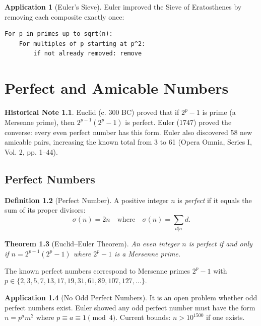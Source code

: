 \documentclass[11pt,a4paper,twoside]{book}
\theoremstyle{eulerstyle}
\newtheorem{theorem}{Theorem}[chapter]
\theoremstyle{definition}
\newtheorem{definition}[theorem]{Definition}
\newtheorem{historical}[theorem]{Historical Note}
\newtheorem{application}[theorem]{Application}
\begin{document}
\begin{application}[Euler's Sieve]
Euler improved the Sieve of Eratosthenes by removing each composite exactly once:
\begin{verbatim}
For p in primes up to sqrt(n):
    For multiples of p starting at p^2:
        if not already removed: remove
\end{verbatim}
\end{application}

\cleardoublepage

\chapter{Perfect and Amicable Numbers}
\label{ch:perfect}

\begin{historical}
Euclid (c. 300 BC) proved that if $2^p - 1$ is prime (a Mersenne prime), then $2^{p-1}(2^p - 1)$ is perfect. Euler (1747) proved the converse: every even perfect number has this form. Euler also discovered 58 new amicable pairs, increasing the known total from 3 to 61 (Opera Omnia, Series I, Vol. 2, pp. 1--44).
\end{historical}

\section{Perfect Numbers}

\begin{definition}[Perfect Number]
A positive integer $n$ is \emph{perfect} if it equals the sum of its proper divisors:
\[
\sigma(n) = 2n \quad \text{where} \quad \sigma(n) = \sum_{d|n} d.
\]
\end{definition}

\begin{theorem}[Euclid--Euler Theorem]
An even integer $n$ is perfect if and only if $n = 2^{p-1}(2^p - 1)$ where $2^p - 1$ is a Mersenne prime.
\end{theorem}

The known perfect numbers correspond to Mersenne primes $2^p - 1$ with $p \in \{2, 3, 5, 7, 13, 17, 19, 31, 61, 89, 107, 127, \dots\}$.

\begin{application}[No Odd Perfect Numbers]
It is an open problem whether odd perfect numbers exist. Euler showed any odd perfect number must have the form $n = p^a m^2$ where $p \equiv a \equiv 1 \pmod{4}$. Current bounds: $n > 10^{1500}$ if one exists.
\end{application}
\end{document}
